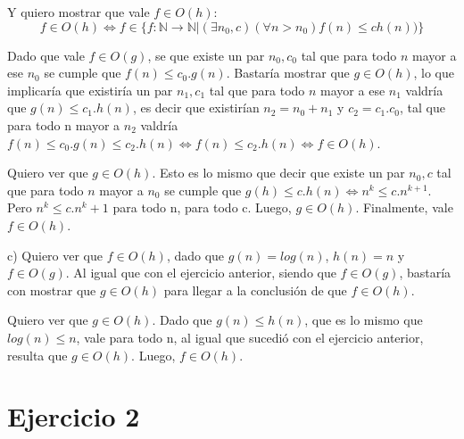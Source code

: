 \documentclass[11pt, spanish]{article}
\begin{document}
Y quiero mostrar que vale $f \in  O(h)$:
\[
f \in  O(h) \iff f \in \{f : \mathbb{N} \to \mathbb{N} | (\exists n_0, c)(\forall n > n_0) f(n) \leq ch(n)) \}
\]

Dado que vale $f \in  O(g)$, se que existe un par $n_0,c_0$ tal que para todo $n$ mayor a ese $n_0$ se cumple que $f(n) \leq c_0.g(n)$. Bastaría mostrar que $g \in O(h)$, lo que implicaría que existiría un par $n_1, c_1$ tal que para todo $n$ mayor a ese $n_1$ valdría que $g(n) \leq c_1.h(n)$, es decir que existirían $n_2=n_0+n_1$ y $c_2=c_1.c_0$, tal que para todo n mayor a $n_2$ valdría $f(n) \leq c_0.g(n) \leq c_2.h(n) \iff f(n) \leq c_2.h(n) \iff f \in O(h)$.

Quiero ver que $g \in O(h)$. Esto es lo mismo que decir que existe un par $n_0, c$ tal que para todo $n$ mayor a $n_0$ se cumple que $g(h) \leq c.h(n) \iff n^k \leq c.n^{k+1}$. Pero $n^k \leq c.n^k+1$ para todo n, para todo c. Luego, $g \in O(h)$. Finalmente, vale $f \in O(h)$.

%
%
\vspace{1em}
c) Quiero ver que $f \in O(h)$, dado que $g(n) = log(n)$, $h(n) = n$ y $f \in O(g)$.
Al igual que con el ejercicio anterior, siendo que $f \in O(g)$, bastaría con mostrar que $g \in O(h)$ para llegar a la conclusión de que $f \in O(h)$.

Quiero ver que $g \in O(h)$. Dado que $g(n) \leq h(n)$, que es lo mismo que $log(n) \leq n$, vale para todo n, al igual que sucedió con el ejercicio anterior, resulta que $g \in O(h)$. Luego, $f \in O(h)$.

\section*{Ejercicio 2}
\end{document}
